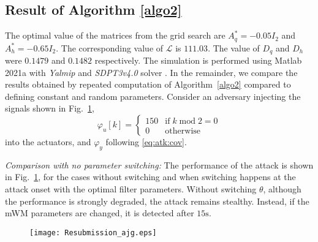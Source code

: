 \subsection{Result of Algorithm \ref{algo2}}
The optimal value of the matrices from the grid search are $A_q^* = -0.05I_2$ and $A_h^*=-0.65 I_2$. 
The corresponding value of $\mathcal{L}$ is $111.03$. The value of $D_q$ and $D_h$ were $0.1479$ and $0.1482$ respectively. The simulation is performed using Matlab 2021a with \textit{Yalmip} \citep{lofberg2004yalmip} and \textit{SDPT3v4.0} solver \citep{toh2012implementation}.
%
In the remainder, we compare the results obtained by repeated computation of Algorithm~\ref{algo2} compared to defining constant and random parameters.
Consider 
an adversary injecting the signals shown in Fig.~\ref{fig:no:switch},
\begin{equation}\label{eq:step}
    \varphi_u[k] = \begin{cases}
        150 & \text{if}\;k\;\text{mod}\;2=0 \\
        0 & \text{otherwise}
    \end{cases}
   \end{equation}
into the actuators, and $\varphi_y$ following \eqref{eq:atk:cov}.
    
\emph{Comparison with no parameter switching:}
The performance of the attack is shown in Fig.~\ref{fig:no:switch}, for the cases without switching and when switching happens at the attack onset with the optimal filter parameters.
Without switching $\theta$, although the performance is strongly degraded, the attack remains stealthy. Instead, if the mWM parameters are changed, it is detected after $15 \mbox{s}$.

\begin{figure}
    \centering
    \texttt{[image: Resubmission\_ajg.eps]}
    \caption{}
    \label{fig:no:switch}
\end{figure}



